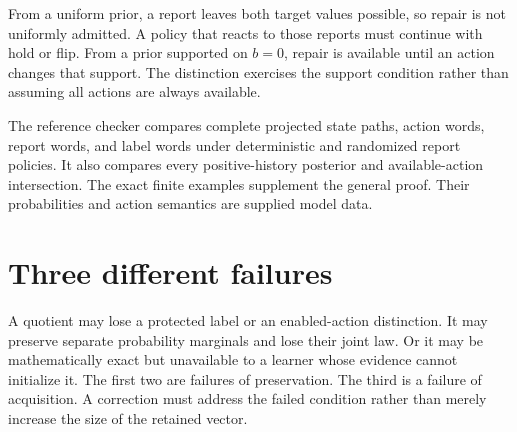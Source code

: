 From a uniform prior, a report leaves both target values possible, so repair is not uniformly admitted. A policy that reacts to those reports must continue with hold or flip. From a prior supported on $b=0$, repair is available until an action changes that support. The distinction exercises the support condition rather than assuming all actions are always available.

The reference checker compares complete projected state paths, action words, report words, and label words under deterministic and randomized report policies. It also compares every positive-history posterior and available-action intersection. The exact finite examples supplement the general proof. Their probabilities and action semantics are supplied model data.

\section{Three different failures}
A quotient may lose a protected label or an enabled-action distinction. It may preserve separate probability marginals and lose their joint law. Or it may be mathematically exact but unavailable to a learner whose evidence cannot initialize it. The first two are failures of preservation. The third is a failure of acquisition. A correction must address the failed condition rather than merely increase the size of the retained vector.
